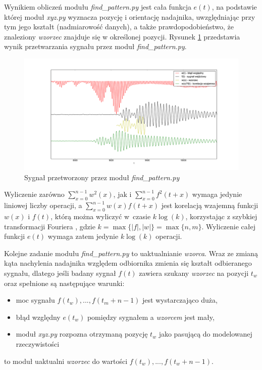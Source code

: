  Wynikiem obliczeń modułu \textit{find\_pattern.py} jest cała funkcja $e(t)$, na podstawie której moduł \textit{xyz.py}
 wyznacza pozycję i orientację nadajnika, uwzględniając przy tym 
 jego kształt (nadmiarowość danych), a także prawdopodobieństwo, że znaleziony \textit{wzorzec} znajduje się w określonej pozycji.
 Rysunek \ref{fig:blad_korel} przedstawia wynik przetwarzania sygnału przez moduł \textit{find\_pattern.py}.

\begin{figure}[h]
    \centering
    \includegraphics[width=1.0\textwidth, trim= 50mm 0mm 40mm 0mm,clip]{blad_korel}
    \caption{Sygnał przetworzony przez moduł \textit{find\_pattern.py}}
    \label{fig:blad_korel}
\end{figure}
 
 
 Wyliczenie zarówno $ \sum\limits_{x=0}^{n-1}  w^2(x) $,
jak i $\sum\limits_{x=0}^{n-1} f^2(t+x)$ wymaga jedynie liniowej liczby operacji, a 
 $\sum\limits_{x=0}^{n-1}  w(x) f(t+x) $ jest korelacją wzajemną funkcji $w(x)$ i $f(t)$, którą
 można wyliczyć w~czasie $k \log(k)$, korzystając z szybkiej transformacji Fouriera \cite{bib:FFT_correlation},
 gdzie $k = \max \{|f|, |w| \} = \max \{n,m\}$. Wyliczenie całej funkcji $e(t)$ wymaga zatem jedynie $k \log(k)$ operacji.

 
 Kolejne zadanie modułu \textit{find\_pattern.py} to uaktualnianie \textit{wzorca}.
 Wraz ze zmianą kąta nachylenia nadajnika względem odbiornika zmienia się kształt odbieranego sygnału,
 dlatego jeśli badany sygnał $f(t)$ zawiera szukany \textit{wzorzec} na pozycji $t_w$ 
 oraz spełnione są następujące warunki:
 \begin{itemize}
  \item moc sygnału $f(t_w), ..., f(t_m+n-1)$ jest wystarczająco duża,
  \item błąd względny $e(t_w)$ pomiędzy sygnałem a \textit{wzorcem} jest mały,
  \item moduł \textit{xyz.py} rozpozna otrzymaną pozycję $t_w$ jako pasującą do modelowanej rzeczywistości
 \end{itemize}
to moduł uaktualni \textit{wzorzec} do wartości $f(t_w), ..., f(t_w+n-1)$.
 
